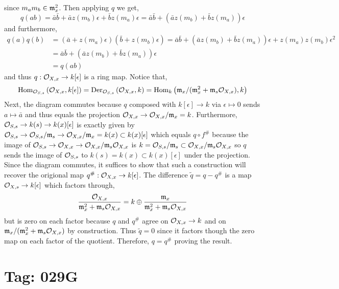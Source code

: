\documentclass[12pt]{article}
\begin{document}
since $m_a m_b \in \mathfrak{m}_x^2$. Then applying $q$ we get,
\[ q(ab) = \bar{a} \bar{b} + \bar{a} z(m_b) \epsilon + \bar{b} z(m_a) \epsilon = \bar{a} \bar{b} + (\bar{a} z(m_b) + \bar{b} z(m_a))\epsilon   \]
and furthermore,
\begin{align*}
q(a) q(b) & = (\bar{a} + z(m_a) \epsilon)(\bar{b} + z(m_b) \epsilon) = \bar{a} \bar{b} + (\bar{a} z(m_b) + \bar{b} z(m_a)) \epsilon + z(m_a) z(m_b) \epsilon^2
\\
& = \bar{a} \bar{b} + (\bar{a} z(m_b) + \bar{b} z(m_a)) \epsilon
\\
& = q(ab)
\end{align*}
and thus $q : \mathcal{O}_{X, x} \to k[\epsilon]$ is a ring map. Notice that,
\[ \mathrm{Hom}_{\mathcal{O}_{S, s}} \left( \mathcal{O}_{X, x}, k[\epsilon] \right) = \mathrm{Der}_{\mathcal{O}_{S, s}}\left(\mathcal{O}_{X, x}, k \right) = \mathrm{Hom}_{k} \left( \mathfrak{m}_x / (\mathfrak{m}_x^2 + \mathfrak{m}_s \mathcal{O}_{X, x}), k \right) \] 
Next, the diagram commutes because $q$ composed with $k[\epsilon] \to k$ via $\epsilon \mapsto 0$ sends $a \mapsto \bar{a}$ and thus equals the projection  $\mathcal{O}_{X, x} \to \mathcal{O}_{X, x} / \mathfrak{m}_x = k$. Furthermore, $\mathcal{O}_{S, s} \to k(s) \to k(x)[\epsilon]$ is exactly given by $\mathcal{O}_{S, s} \to \mathcal{O}_{S, s} / \mathfrak{m}_s \to \mathcal{O}_{X, x} / \mathfrak{m}_x = k(x) \subset k(x)[\epsilon]$ which equals $q \circ f^\#$ because the image of $\mathcal{O}_{S, s} \to \mathcal{O}_{X, x} \to \mathcal{O}_{X, x} / \mathfrak{m}_s \mathcal{O}_{X, x}$ is $k = \mathcal{O}_{S, s} / \mathfrak{m}_s \subset \mathcal{O}_{X, x} / \mathfrak{m}_s \mathcal{O}_{X, x}$ so $q$ sends the image of $\mathcal{O}_{S, s}$ to $k(s) = k(x) \subset k(x)[\epsilon]$ under the projection. Since the diagram commutes, it suffices to show that such a construction will recover the origional map $q^\# : \mathcal{O}_{X, x} \to k[\epsilon]$. The difference $\tilde{q} = q - q^\#$ is a map $\mathcal{O}_{X, s} \to k[\epsilon]$ which factors through,
\[ \frac{\mathcal{O}_{X, x}}{\mathfrak{m}_x^2 + \mathfrak{m}_s \mathcal{O}_{X, x}} = k \oplus \frac{\mathfrak{m}_x}{\mathfrak{m}_x^2 + \mathfrak{m}_s \mathcal{O}_{X, x}} \]
but is zero on each factor because $q$ and $q^\#$ agree on $\mathcal{O}_{X, x} \to k$ and on $\mathfrak{m}_x / (\mathfrak{m}_x^2 + \mathfrak{m}_s \mathcal{O}_{X, x})$ by construction. Thus $\tilde{q} = 0$ since it factors though the zero map on each factor of the quotient. Therefore, $q = q^\#$ proving the result. 

\section{Tag: 029G}
\end{document}
